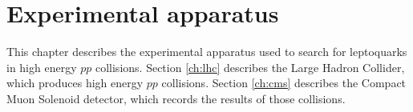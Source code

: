 \chapter{Experimental apparatus}
\label{ch:experiment}

This chapter describes the experimental apparatus used to search for 
leptoquarks in high energy $pp$ collisions.
Section \ref{ch:lhc} describes the Large Hadron Collider, which 
produces high energy $pp$ collisions.
Section \ref{ch:cms} describes the Compact Muon Solenoid detector,
which records the results of those collisions.

